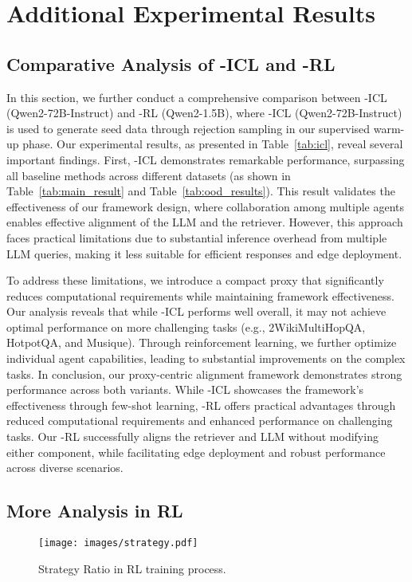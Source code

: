 \section{Additional Experimental Results}\label{app:additional_experiments}

\subsection{Comparative Analysis of \modelname-ICL and \modelname-RL}

In this section, we further conduct a comprehensive comparison between \modelname-ICL (Qwen2-72B-Instruct) and \modelname-RL (Qwen2-1.5B), where \modelname-ICL (Qwen2-72B-Instruct) is used to generate seed data through rejection sampling in our supervised warm-up phase.
Our experimental results, as presented in Table~\ref{tab:icl}, reveal several important findings. First, \modelname-ICL demonstrates remarkable performance, surpassing all baseline methods across different datasets (as shown in Table~\ref{tab:main_result} and Table~\ref{tab:ood_results}). 
This result validates the effectiveness of our framework design, where collaboration among multiple agents enables effective alignment of the LLM and the retriever.
However, this approach faces practical limitations due to substantial inference overhead from multiple LLM queries, making it less suitable for efficient responses and edge deployment.

To address these limitations, we introduce a compact proxy that significantly reduces computational requirements while maintaining framework effectiveness.
Our analysis reveals that while \modelname-ICL performs well overall, it may not achieve optimal performance on more challenging tasks (e.g., 2WikiMultiHopQA, HotpotQA, and Musique).
Through reinforcement learning, we further optimize individual agent capabilities, leading to substantial improvements on the complex tasks.
In conclusion, our proxy-centric alignment framework demonstrates strong performance across both variants. While \modelname-ICL showcases the framework's effectiveness through few-shot learning, \modelname-RL offers practical advantages through reduced computational requirements and enhanced performance on challenging tasks. Our \modelname-RL successfully aligns the retriever and LLM without modifying either component, while facilitating edge deployment and robust performance across diverse scenarios.

\subsection{More Analysis in RL}
\begin{figure}[h]
    \centering
    \texttt{[image: images/strategy.pdf]}
    \caption{Strategy Ratio in RL training process.}
    \label{fig:strategy_ratio}
\end{figure}


